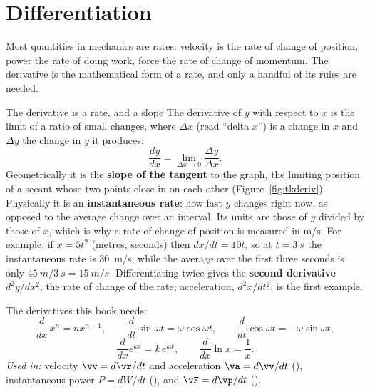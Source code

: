 \section{Differentiation}

Most quantities in mechanics are rates: velocity is the rate of change of position, power the rate of doing
work, force the rate of change of momentum. The derivative is the mathematical form of a rate, and only a
handful of its rules are needed.

\begin{defbox}{The derivative is a rate, and a slope}
The derivative of $y$ with respect to $x$ is the limit of a ratio of small changes, where $\Delta x$
(read ``delta $x$'') is a change in $x$ and $\Delta y$ the change in $y$ it produces:
\[
\frac{dy}{dx}=\lim_{\Delta x\to0}\frac{\Delta y}{\Delta x}.
\]
Geometrically it is the \textbf{slope of the tangent} to the graph, the limiting position of a secant
whose two points close in on each other (Figure~\ref{fig:tkderiv}). Physically it is an
\textbf{instantaneous rate}: how fast $y$ changes right now, as opposed to the average change over an
interval. Its units are those of $y$ divided by those of $x$, which is why a rate of change of position
is measured in \si{m/s}. For example, if $x=5t^{2}$ (metres, seconds) then $dx/dt=10t$, so at
$t=\SI{3}{s}$ the instantaneous rate is \SI{30}{m/s}, while the average over the first three seconds is
only $\SI{45}{m}/\SI{3}{s}=\SI{15}{m/s}$. Differentiating twice gives the \textbf{second derivative}
$d^{2}y/dx^{2}$, the rate of change of the rate; acceleration, $d^{2}x/dt^{2}$, is the first example.

The derivatives this book needs:
\[
\frac{d}{dx}\,x^{n}=nx^{n-1},\qquad
\frac{d}{dt}\sin\omega t=\omega\cos\omega t,\qquad
\frac{d}{dt}\cos\omega t=-\omega\sin\omega t,
\]
\[
\frac{d}{dx}e^{kx}=k\,e^{kx},\qquad \frac{d}{dx}\ln x=\frac{1}{x}.
\]
\emph{Used in:} velocity $\vv=d\vr/dt$ and acceleration $\va=d\vv/dt$ (), instantaneous
power $P=dW/dt$ (), and $\vF=d\vp/dt$ ().
\end{defbox}

\begin{figure}[htbp]
\centering
{}
\end{figure}


